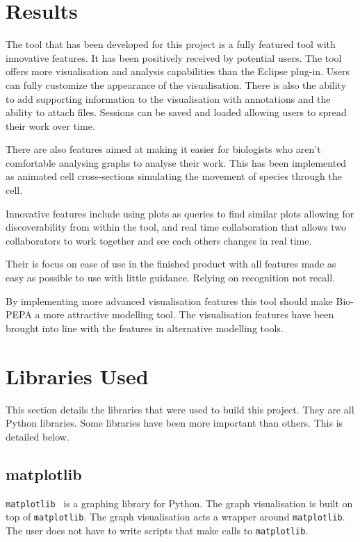 \section{Results}

The tool that has been developed for this project is a fully featured tool with innovative features.  It has been positively received by potential users.
The tool offers more visualisation and analysis capabilities than the Eclipse plug-in.  Users can fully customize the appearance of the visualisation.  There is also the ability to add supporting information to the visualisation with annotations and the ability to attach files.  Sessions can be saved and loaded allowing users to spread their work over time.

There are also features aimed at making it easier for biologists who aren't comfortable analysing graphs to analyse their work.  This has been implemented as animated cell cross-sections simulating the movement of species through the cell.

Innovative features include using plots as queries to find similar plots allowing for discoverability from within the tool, and real time collaboration that allows two collaborators to work together and see each others changes in real time.

Their is focus on ease of use in the finished product with all features made as easy as possible to use with little guidance.  Relying on recognition not recall.

By implementing more advanced visualisation features this tool should make Bio-PEPA a more attractive modelling tool. The visualisation features have been brought into line with the features in alternative modelling tools.

\section{Libraries Used}

This section details the libraries that were used to build this project.  They are all Python libraries.  Some libraries have been more important than others.  This is detailed below.

\subsection{matplotlib}

\texttt{matplotlib}~\cite{mpl} is a graphing library for Python.  The graph visualisation is built on top of \texttt{matplotlib}.  The graph visualisation acts a wrapper around \texttt{matplotlib}.  The user does not have to write scripts that make calls to \texttt{matplotlib}.

